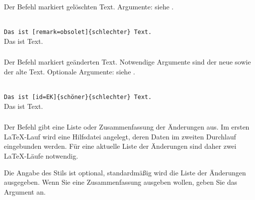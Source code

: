 \subsubsection{}
\DescribeMacro{\deleted}

Der Befehl  markiert gelöschten Text.
Argumente: siehe .

\begin{chusage}
		\>\\
	\usageexample
		\>\texttt{Das ist [remark=obsolet]\{schlechter\} Text.}\\
		\>Das ist  Text.
\end{chusage}


\subsubsection{}
\DescribeMacro{\replaced}

Der Befehl  markiert geänderten Text.
Notwendige Argumente sind der neue sowie der alte Text.
Optionale Argumente: siehe .

\begin{chusage}
		\>\\
	\usageexample
		\>\texttt{Das ist [id=EK]\{schöner\}\{schlechter\} Text.}\\
		\>Das ist  Text.
\end{chusage}


\subsubsection{}
\DescribeMacro{\listofchanges}

Der Befehl  gibt eine Liste oder Zusammenfassung der Änderungen aus.
Im ersten \LaTeX-Lauf wird eine Hilfsdatei angelegt, deren Daten im zweiten Durchlauf eingebunden werden.
Für eine aktuelle Liste der Änderungen sind daher zwei \LaTeX-Läufe notwendig.

Die Angabe des Stils ist optional, standardmäßig wird die Liste der Änderungen ausgegeben.
Wenn Sie eine Zusammenfassung ausgeben wollen, geben Sie das Argument  an.

